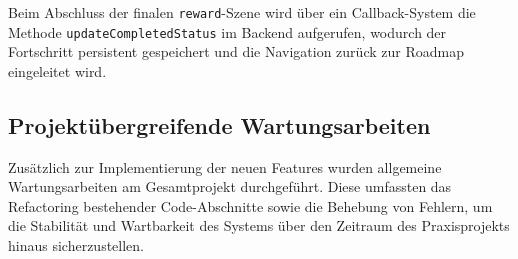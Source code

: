 Beim Abschluss der finalen \texttt{reward}-Szene wird über ein Callback-System die Methode \texttt{updateCompletedStatus} im Backend aufgerufen, wodurch der Fortschritt 
persistent gespeichert und die Navigation zurück zur Roadmap eingeleitet wird.


\subsection{Projektübergreifende Wartungsarbeiten}
Zusätzlich zur Implementierung der neuen Features wurden allgemeine Wartungsarbeiten am Gesamtprojekt durchgeführt. Diese umfassten das Refactoring bestehender Code-Abschnitte 
sowie die Behebung von Fehlern, um die Stabilität und Wartbarkeit des Systems über den Zeitraum des Praxisprojekts hinaus sicherzustellen.